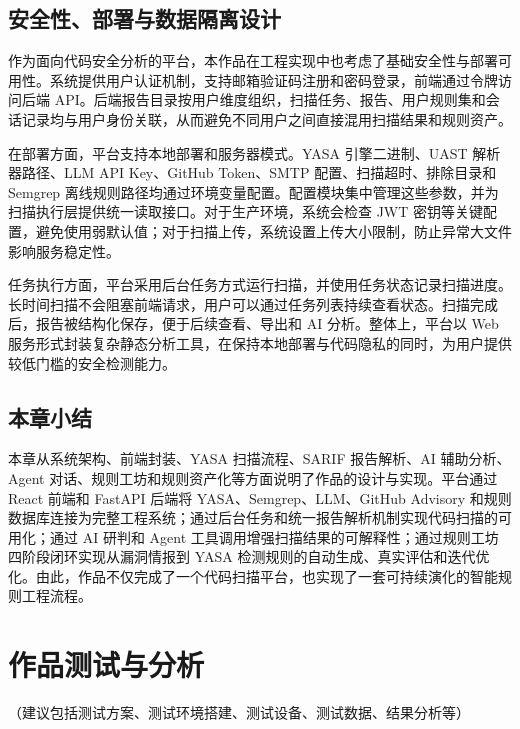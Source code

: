 \documentclass[a4paper,12pt,UTF8]{ctexart}
\numberwithin{figure}{section}
\numberwithin{table}{section}
\numberwithin{equation}{section}
\begin{document}
\subsection{安全性、部署与数据隔离设计}

{\songti
作为面向代码安全分析的平台，本作品在工程实现中也考虑了基础安全性与部署可用性。系统提供用户认证机制，支持邮箱验证码注册和密码登录，前端通过令牌访问后端 API。后端报告目录按用户维度组织，扫描任务、报告、用户规则集和会话记录均与用户身份关联，从而避免不同用户之间直接混用扫描结果和规则资产。

在部署方面，平台支持本地部署和服务器模式。YASA 引擎二进制、UAST 解析器路径、LLM API Key、GitHub Token、SMTP 配置、扫描超时、排除目录和 Semgrep 离线规则路径均通过环境变量配置。配置模块集中管理这些参数，并为扫描执行层提供统一读取接口。对于生产环境，系统会检查 JWT 密钥等关键配置，避免使用弱默认值；对于扫描上传，系统设置上传大小限制，防止异常大文件影响服务稳定性。

任务执行方面，平台采用后台任务方式运行扫描，并使用任务状态记录扫描进度。长时间扫描不会阻塞前端请求，用户可以通过任务列表持续查看状态。扫描完成后，报告被结构化保存，便于后续查看、导出和 AI 分析。整体上，平台以 Web 服务形式封装复杂静态分析工具，在保持本地部署与代码隐私的同时，为用户提供较低门槛的安全检测能力。
\par}

\subsection{本章小结}

{\songti
本章从系统架构、前端封装、YASA 扫描流程、SARIF 报告解析、AI 辅助分析、Agent 对话、规则工坊和规则资产化等方面说明了作品的设计与实现。平台通过 React 前端和 FastAPI 后端将 YASA、Semgrep、LLM、GitHub Advisory 和规则数据库连接为完整工程系统；通过后台任务和统一报告解析机制实现代码扫描的可用化；通过 AI 研判和 Agent 工具调用增强扫描结果的可解释性；通过规则工坊四阶段闭环实现从漏洞情报到 YASA 检测规则的自动生成、真实评估和迭代优化。由此，作品不仅完成了一个代码扫描平台，也实现了一套可持续演化的智能规则工程流程。
\par}

\newpage

\section{作品测试与分析}

（建议包括测试方案、测试环境搭建、测试设备、测试数据、结果分析等）
\end{document}
